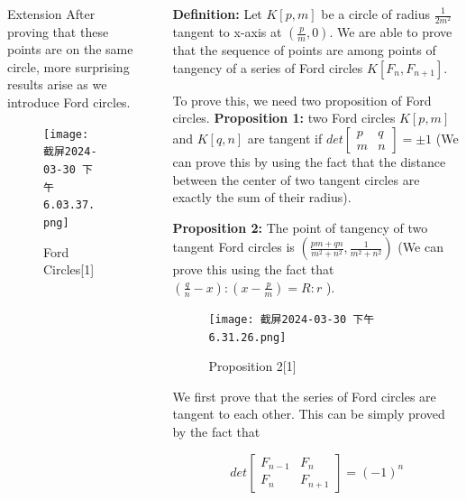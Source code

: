 \documentclass[final]{beamer}
\newlength{\sepwidth}
\newlength{\colwidth}
\newcommand{\separatorcolumn}{\begin{column}{\sepwidth}\end{column}}
\begin{document}
\begin{frame}[t]
\begin{columns}[t]
\begin{column}{\colwidth}
\begin{block}{Extension}
    \newline
    After proving that these points are on the same circle, more surprising results arise as we introduce Ford circles. 
    \begin{figure}
        \centering
        \texttt{[image: 截屏2024-03-30 下午6.03.37.png]}
        \caption{Ford Circles[1]}
        \label{fig:enter-label}
    \end{figure}


 

  \end{block}
\end{column}{\colwidth}
\separatorcolumn

\begin{column}{\colwidth}
\newline
\newline
\newline
\textbf{Definition:} Let $K[p,m]$ be a circle of radius $\frac{1}{2m^2}$ tangent to x-axis at $(\frac{p}{m},0)$.
 \newline
We are able to prove that the sequence of points are among points of tangency of a series of Ford circles $K[F_{n},F_{n+1}]$.
\newline

To prove this, we need two proposition of Ford circles.
\newline \textbf{Proposition 1:} two Ford circles $K[p,m]$ and $K[q,n]$ are tangent if  $det\begin{bmatrix}
    p & q \\
    m & n
\end{bmatrix} = \pm 1$ (We can prove this by using the fact that the distance between the center of two tangent circles are exactly the sum of their radius).
\newline 

\textbf{Proposition 2:} The point of tangency of two tangent Ford circles is $(\frac{pm+qn}{m^2+n^2}, \frac{1}{m^2 + n^2})$ (We can prove this using the fact that $(\frac{q}{n} - x):(x - \frac{p}{m}) = R:r$ ).

\begin{figure}
    \centering
    \texttt{[image: 截屏2024-03-30 下午6.31.26.png]}
    \caption{Proposition 2[1]}
    \label{fig:enter-label}
\end{figure}
We first prove that the series of Ford circles are tangent to each other. This can be simply proved by the fact that 

    $$det\begin{bmatrix}
    F_{n-1} & F_{n} \\
    F_{n} & F_{n+1}
\end{bmatrix} = (-1)^n$$
  

\end{column}
\end{columns}
\end{frame}
\end{document}
